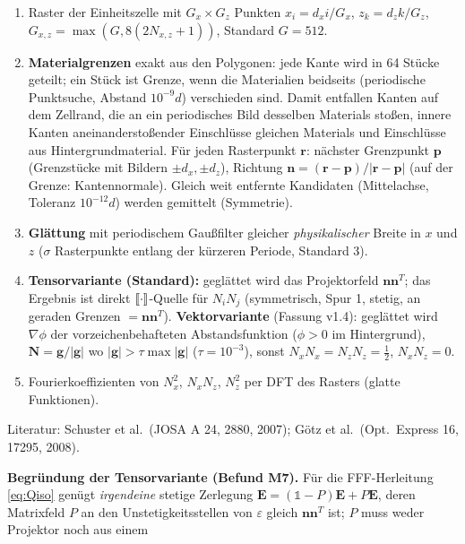 \begin{tcolorbox}[title=Algorithmus NF: Normalenfeld für $y$-invariante 2D-Querschnitte (v1.5)\label{alg:nfield}]
\begin{enumerate}[nosep]
  \item Raster der Einheitszelle mit $G_x\times G_z$ Punkten $x_i=d_xi/G_x$, $z_k=d_zk/G_z$,
        $G_{x,z}=\max(G,8(2N_{x,z}+1))$, Standard $G=512$.
  \item \textbf{Materialgrenzen} exakt aus den Polygonen: jede Kante wird in 64 Stücke geteilt; ein Stück ist
        Grenze, wenn die Materialien beidseits (periodische Punktsuche, Abstand $10^{-9}d$) verschieden sind.
        Damit entfallen Kanten auf dem Zellrand, die an ein periodisches Bild desselben Materials stoßen,
        innere Kanten aneinanderstoßender Einschlüsse gleichen Materials und Einschlüsse aus Hintergrundmaterial.
        Für jeden Rasterpunkt $\mathbf r$: nächster Grenzpunkt $\mathbf p$ (Grenzstücke mit Bildern $\pm d_x,\pm d_z$),
        Richtung $\mathbf n=(\mathbf r-\mathbf p)/|\mathbf r-\mathbf p|$ (auf der Grenze: Kantennormale).
        Gleich weit entfernte Kandidaten (Mittelachse, Toleranz $10^{-12}d$) werden gemittelt (Symmetrie).
  \item \textbf{Glättung} mit periodischem Gaußfilter gleicher \emph{physikalischer} Breite in $x$ und $z$
        ($\sigma$ Rasterpunkte entlang der kürzeren Periode, Standard 3).
  \item \textbf{Tensorvariante (Standard):} geglättet wird das Projektorfeld $\mathbf n\mathbf n^T$; das Ergebnis
        ist direkt $[\![\cdot]\!]$-Quelle für $N_iN_j$ (symmetrisch, Spur 1, stetig, an geraden Grenzen $=\mathbf n\mathbf n^T$).
        \textbf{Vektorvariante} (Fassung v1.4): geglättet wird $\nabla\phi$ der vorzeichenbehafteten Abstandsfunktion
        ($\phi>0$ im Hintergrund), $\mathbf N=\mathbf g/|\mathbf g|$ wo $|\mathbf g|>\tau\max|\mathbf g|$ ($\tau=10^{-3}$),
        sonst $N_xN_x=N_zN_z=\tfrac12$, $N_xN_z=0$.
  \item Fourierkoeffizienten von $N_x^2$, $N_xN_z$, $N_z^2$ per DFT des Rasters (glatte Funktionen).
\end{enumerate}
Literatur: Schuster et al.\ (JOSA A 24, 2880, 2007); Götz et al.\ (Opt.\ Express 16, 17295, 2008).
\end{tcolorbox}
\textbf{Begründung der Tensorvariante (Befund M7).} Für die FFF-Herleitung \eqref{eq:Qiso} genügt
\emph{irgendeine} stetige Zerlegung $\mathbf E=(\mathbb 1-P)\mathbf E+P\mathbf E$, deren Matrixfeld $P$ an den
Unstetigkeitsstellen von $\varepsilon$ gleich $\mathbf n\mathbf n^T$ ist; $P$ muss weder Projektor noch aus einem
